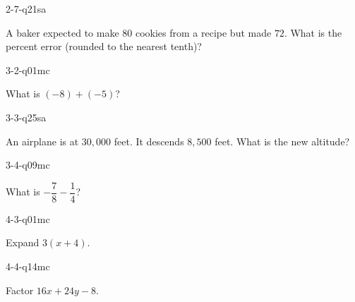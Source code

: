 \begin{practiceQuestion}{2-7-q21}{sa}
\begin{questionText}
A baker expected to make $80$ cookies from a recipe but made $72$. What is the percent error (rounded to the nearest tenth)?
\end{questionText}
\end{practiceQuestion}

\begin{practiceQuestion}{3-2-q01}{mc}
\begin{questionText}
What is $(-8) + (-5)$?
\end{questionText}
\end{practiceQuestion}

\begin{practiceQuestion}{3-3-q25}{sa}
\begin{questionText}
An airplane is at $30{,}000$ feet. It descends $8{,}500$ feet. What is the new altitude?
\end{questionText}
\end{practiceQuestion}

\begin{practiceQuestion}{3-4-q09}{mc}
\begin{questionText}
What is $-\dfrac{7}{8} - \dfrac{1}{4}$?
\end{questionText}
\end{practiceQuestion}

\begin{practiceQuestion}{4-3-q01}{mc}
\begin{questionText}
Expand $3(x + 4)$.
\end{questionText}
\end{practiceQuestion}

\begin{practiceQuestion}{4-4-q14}{mc}
\begin{questionText}
Factor $16x + 24y - 8$.
\end{questionText}
\end{practiceQuestion}


